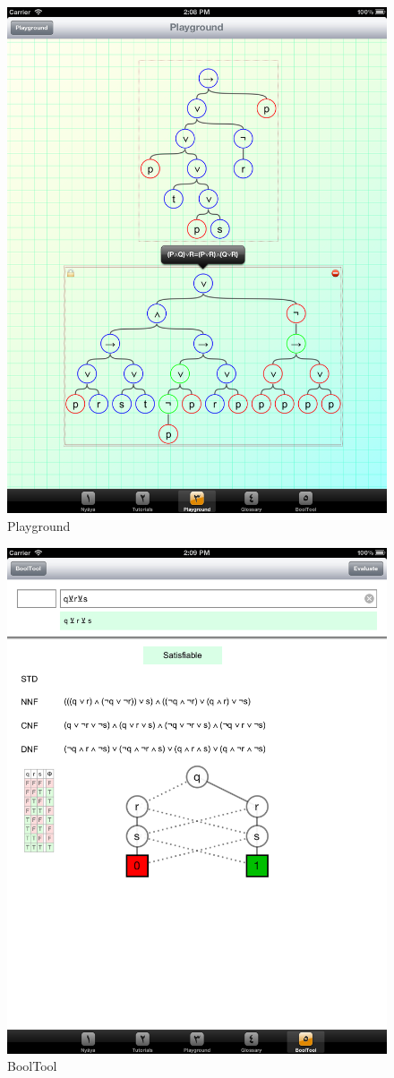 \begin{figure}[htbp]
\begin{center}
\includegraphics[width=12cm]{pics/S_Playground.png}
\caption{Playground}
\label{fig:ScreenshotPlayground}
\end{center}
\end{figure}

\begin{figure}[htbp]
\begin{center}
\includegraphics[width=12cm]{pics/S_BoolTool.png}
\caption{BoolTool}
\label{fig:ScrrenshotBoolTool}
\end{center}
\end{figure}



